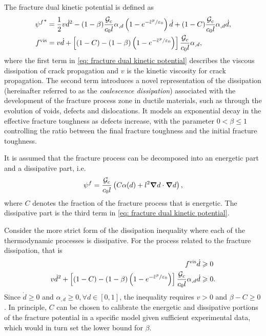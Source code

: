 The fracture dual kinetic potential is defined as
\begin{subequations}
  \begin{align}
    {\psi^f}^*   & = \dfrac{1}{2} v \dot{d}^2 - (1-\beta)\dfrac{\Gc}{c_0l}\alpha_{,d}\left( 1-e^{-\ep/\varepsilon_0} \right)\dot{d} + (1-C) \dfrac{\Gc}{c_0 l}\alpha_{, d}\dot{d}, \label{eq: fracture dual kinetic potential} \\
    f^\text{vis} & = v \dot{d} + \left[ (1-C) - (1-\beta) \left( 1-e^{-\ep/\varepsilon_0} \right) \right] \dfrac{\Gc}{c_0 l} \alpha_{, d},                                                                                     
  \end{align}
\end{subequations}
where the first term in \eqref{eq: fracture dual kinetic potential} describes the viscous dissipation of crack propagation and $v$ is the kinetic viscosity for crack propagation.
The second term introduces a novel representation of the dissipation (hereinafter referred to as the \textit{coalescence dissipation}) associated with the development of the fracture process zone in ductile materials, such as through the evolution of voids, defects and dislocations. It models an exponential decay in the effective fracture toughness as defects increase, with the parameter $0 < \beta \leqslant 1 $ controlling the ratio between the final fracture toughness and the initial fracture toughness.

It is assumed that the fracture process can be decomposed into an energetic part and a dissipative part, i.e.
\begin{align}
  \psi^f = \dfrac{{\mathcal{G}_c}}{c_0 l} \left( C\alpha(d) + l^2 \boldsymbol{\nabla} d \cdot \boldsymbol{\nabla} d \right), \label{eq: modified fracture energy} \\
\end{align}
where $C$ denotes the fraction of the fracture process that is energetic. The dissipative part is the third term in \eqref{eq: fracture dual kinetic potential}.

\begin{remark}
  Consider the more strict form of the dissipation inequality where each of the thermodynamic processes is dissipative. For the process related to the fracture dissipation, that is
  \begin{align*}
    f^\text{vis} \dot{d}                                                                                                           & \geqslant 0  \\
    v \dot{d}^2 + \left[ (1-C) - (1-\beta) \left( 1-e^{-\ep/\varepsilon_0} \right) \right] \dfrac{\Gc}{c_0 l} \alpha_{, d} \dot{d} & \geqslant 0. 
  \end{align*}
  Since $\dot{d} \geqslant 0$ and $\alpha_{, d} \geqslant 0, \forall d \in [0, 1]$, the inequality requires $v > 0$ and $\beta - C \geqslant 0$.  In principle, $C$ can be chosen to calibrate the energetic and dissipative portions of the fracture potential in a specific model given sufficient experimental data, which would in turn set the lower bound for $\beta$.
\end{remark}

